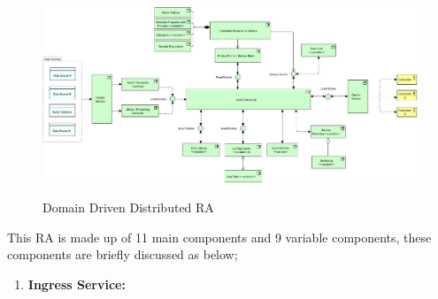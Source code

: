 \documentclass[runningheads]{llncs}
\begin{document}
\begin{figure}[h!]
    \centering
    \includegraphics[width=12cm]{Media/Metamycelium.jpg}
    \label{RA}
    \caption{Domain Driven Distributed RA}
\end{figure}

This RA is made up of 11 main components and 9 variable components, these components are briefly discussed as below; 

\begin{enumerate}
    \item \textbf{Ingress Service:} 
\end{enumerate}

%
%



\end{document}
